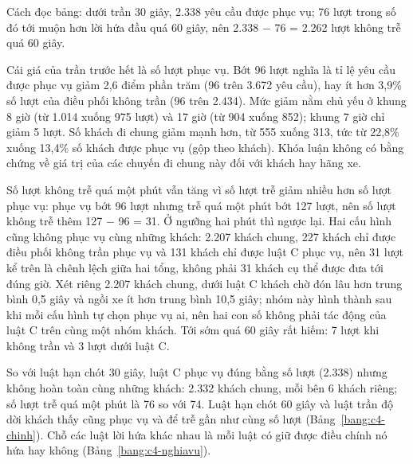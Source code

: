 Cách đọc bảng: dưới trần 30 giây, 2.338 yêu cầu được phục vụ; 76 lượt trong số đó tới muộn hơn lời hứa đầu quá 60
giây, nên 2.338 $-$ 76 = 2.262 lượt không trễ quá 60 giây.

Cái giá của trần trước hết là số lượt phục vụ. Bớt 96 lượt nghĩa là tỉ lệ yêu cầu được phục vụ giảm 2,6 điểm phần
trăm (96 trên 3.672 yêu cầu), hay ít hơn 3,9\% số lượt của điều phối không trần (96 trên 2.434). Mức giảm nằm chủ yếu
ở khung 8 giờ (từ 1.014 xuống 975 lượt) và 17 giờ (từ 904 xuống 852); khung 7 giờ chỉ giảm 5 lượt. Số khách đi chung
giảm mạnh hơn, từ 555 xuống 313, tức từ 22,8\% xuống 13,4\% số khách được phục vụ (gộp theo khách). Khóa luận không
có bằng chứng về giá trị của các chuyến đi chung này đối với khách hay hãng xe.

Số lượt không trễ quá một phút vẫn tăng vì số lượt trễ giảm nhiều hơn số lượt phục vụ: phục vụ bớt 96 lượt nhưng
trễ quá một phút bớt 127 lượt, nên số lượt không trễ thêm 127 $-$ 96 = 31. Ở ngưỡng hai phút thì ngược lại. Hai cấu
hình cũng không phục vụ cùng những khách: 2.207 khách chung, 227 khách chỉ được điều phối không trần phục vụ và 131
khách chỉ được luật C phục vụ, nên 31 lượt kể trên là chênh lệch giữa hai tổng, không phải 31 khách cụ thể được đưa
tới đúng giờ. Xét riêng 2.207 khách chung, dưới luật C khách chờ đón lâu hơn trung bình 0,5 giây và ngồi xe ít hơn
trung bình 10,5 giây; nhóm này hình thành sau khi mỗi cấu hình tự chọn phục vụ ai, nên hai con số không phải tác động
của luật C trên cùng một nhóm khách. Tới sớm quá 60 giây rất hiếm: 7 lượt khi không trần và 3 lượt dưới luật C.

So với luật hạn chót 30 giây, luật C phục vụ đúng bằng số lượt (2.338) nhưng không hoàn toàn cùng những khách: 2.332
khách chung, mỗi bên 6 khách riêng; số lượt trễ quá một phút là 76 so với 74. Luật hạn chót 60 giây và luật trần độ
dời khách thấy cũng phục vụ và để trễ gần như cùng số lượt (Bảng~\ref{bang:c4-chinh}). Chỗ các luật lời hứa khác
nhau là mỗi luật có giữ được điều chính nó hứa hay không (Bảng~\ref{bang:c4-nghiavu}).

